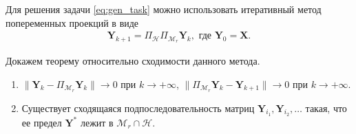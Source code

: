 \documentclass[12pt,a4paper,fleqn,leqno]{article}
\newcommand{\bfX}{\mathbf{X}}
\newcommand{\bfY}{\mathbf{Y}}
\newcommand{\calH}{\mathcal{H}}
\newcommand{\calM}{\mathcal{M}}
\newcommand{\be}{\begin{eqnarray}}
\newcommand{\ee}{\end{eqnarray}}
\begin{document}
Для решения задачи \eqref{eq:gen_task} можно использовать итеративный метод попеременных проекций в виде
\be
   \bfY_{k+1}=\Pi_\calH \Pi_{\calM_r} \bfY_{k}, \mbox{\ где\ } \bfY_{0}=\bfX.
\ee

Докажем теорему относительно сходимости данного метода.

\begin{theorem}
\label{th:converg}
\begin{enumerate}
Пусть пространство $\calM_r$ является замкнутым в топологии, порождаемой нормой $\|\cdot\|$. Тогда
\item $\|\bfY_k - \Pi_{\calM_r}\bfY_k\| \to 0$ при $k \to +\infty$, $\|\Pi_{\calM_r}\bfY_k - \bfY_{k+1}\| \to 0$ при $k \to +\infty$.
\item Существует сходящаяся подпоследовательность матриц $\bfY_{i_1}, \bfY_{i_2}, \ldots$ такая, что ее предел $\bfY^*$ лежит в $\calM_r \cap \calH$.
\end{enumerate}
\end{theorem}
\end{document}
